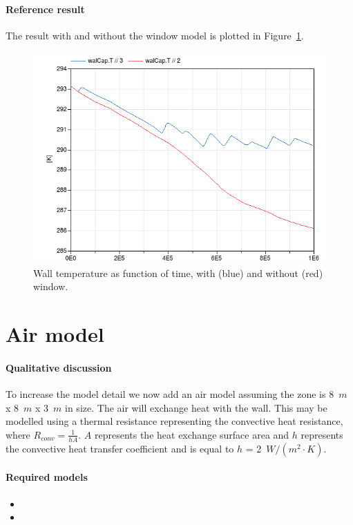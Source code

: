 \documentclass[10pt,a4paper]{article}
\begin{document}
\paragraph{Reference result}
The result with and without the window model
is plotted in Figure~\ref{fig:res2}.

\begin{figure}[h!]
\centering
\includegraphics[scale=0.6]{result2.png}
\caption{Wall temperature as function of time,
with (blue) and without (red) window.}
\label{fig:res2}
\end{figure}

\newpage

\section{Air model}
\paragraph{Qualitative discussion}
To increase the model detail we now add
an air model assuming the zone is 8~$m$ x 8~$m$ x 3~$m$ in size.
The air will exchange heat with the wall.
This may be modelled using a thermal resistance representing the convective heat resistance,
where $R_{conv}=\frac{1}{hA}$. $A$ represents the heat exchange 
surface area and $h$ represents the convective heat transfer coefficient and is equal to $h$ = 2~${W/(m^2\cdot K)}$.

\paragraph{Required models}
\begin{itemize}
\item {}
\item {}
\end{itemize}
\end{document}
